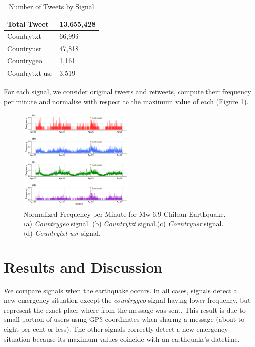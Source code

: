 \documentclass{ewic}
\begin{document}
\begin{table}[]
	\centering
	\caption{Number of Tweets by Signal}
	\begin{tabular}{|l|l|}
		\hline
		Total Tweet    & 13,655,428 \\ \hline
		Countrytxt     & 66,996     \\ \hline
		Countryusr     & 47,818     \\ \hline
		Countrygeo     & 1,161      \\ \hline
		Countrytxt-usr & 3,519      \\ \hline
	\end{tabular}
	
	\label{signalsTweets}
\end{table}

For each signal, we consider original tweets and retweets, compute their frequency per minute and normalize with respect to the maximum value of each (Figure \ref{signalsTweets}).

\begin{figure}[h]
	
	\centering
	\includegraphics[width=0.5\textwidth]{img/freq_per_minute.png}
	\caption{Normalized Frequency per Minute for Mw 6.9 Chilean Earthquake. (a) \textit{Countrygeo} signal. (b) \textit{Countrytxt} signal.(c) \textit{Countryusr} signal. (d) \textit{Countrytxt-usr} signal.}
\end{figure}

\section{Results and Discussion}

We compare signals when the earthquake occurs. In all cases, signals detect a new emergency situation except the \textit{countrygeo} signal having lower frequency, but represent the exact place where from the message was sent. This result is due to small portion of users using GPS coordinates when sharing a message (about to eight per cent or less). The other signals correctly detect  a new emergency situation because its maximum values coincide with an earthquake's datetime.
\end{document}

